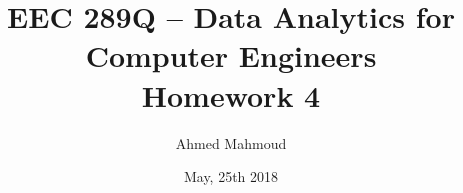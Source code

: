 \documentclass[12pt] {article}
\begin{document}
\title{EEC 289Q – Data Analytics for Computer Engineers \\ Homework 4}
\author{Ahmed Mahmoud}
\date{May, 25th 2018} 

\maketitle




\end{document}
